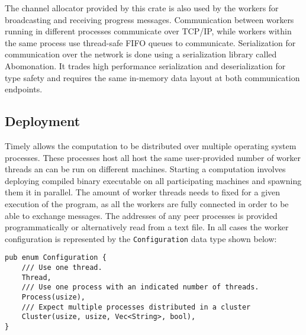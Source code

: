 The channel allocator provided by this crate is also used by the workers for
broadcasting and receiving progress messages. Communication between workers
running in different processes communicate over TCP/IP, while workers within
the same process use thread-safe FIFO queues to communicate.
Serialization for communication over the network is done using a serialization
library called Abomonation. It trades high performance serialization and 
deserialization for type safety and requires the same in-memory data layout
at both communication endpoints.

\subsection{Deployment}

Timely allows the computation to be distributed over multiple operating system
processes. These processes host all host the same user-provided number of
worker threads an can be run on different machines. Starting a computation
involves deploying compiled binary executable on all participating machines
and spawning them it in parallel.
The amount of worker threads needs to fixed for a given execution of the
program, as all the workers are fully connected in order to be able to exchange
messages. The addresses of any peer processes is provided programmatically
or alternatively read from a text file. In all cases the worker configuration
is represented by the \lstinline{Configuration} data type shown below:

\begin{lstlisting}[caption={[Timely's worker configuration data type]
Timely's worker configuration is one the three options. The parameters in 
\lstinline{Cluster} indicates the number of threads per host, the index
of the local host, the list of all participating hosts and a boolean flag
to enable reporting.}]
pub enum Configuration {
    /// Use one thread.
    Thread,
    /// Use one process with an indicated number of threads.
    Process(usize),
    /// Expect multiple processes distributed in a cluster
    Cluster(usize, usize, Vec<String>, bool),
}
\end{lstlisting}
